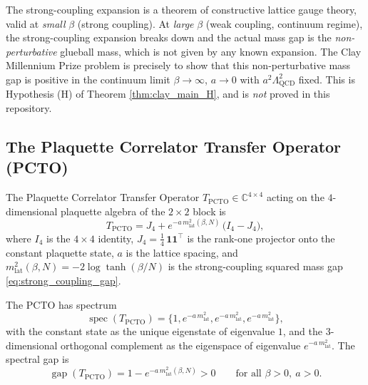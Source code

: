 \begin{remark}
\label{rem:strong_coupling_limits}
The strong-coupling expansion is a theorem of constructive lattice
gauge theory, valid at \emph{small} $\beta$ (strong coupling). At
\emph{large} $\beta$ (weak coupling, continuum regime), the
strong-coupling expansion breaks down and the actual mass gap is the
\emph{non-perturbative} glueball mass, which is not given by any
known expansion. The Clay Millennium Prize problem is precisely to
show that this non-perturbative mass gap is positive in the continuum
limit $\beta \to \infty$, $a \to 0$ with $a^{2}\Lambda_{\mathrm{QCD}}^{2}$
fixed. This is Hypothesis (H) of Theorem \ref{thm:clay_main_H}, and
is \emph{not} proved in this repository.
\end{remark}

\subsection{The Plaquette Correlator Transfer Operator (PCTO)}

\begin{definition}[PCTO]
\label{def:pcto}
The Plaquette Correlator Transfer Operator
$T_{\mathrm{PCTO}} \in \mathbb{C}^{4\times 4}$ acting on the
$4$-dimensional plaquette algebra of the $2\times 2$ block is
\begin{equation}
  \label{eq:pcto_def}
  T_{\mathrm{PCTO}}
  = J_{4} + e^{-a\, m_{\mathrm{lat}}^{2}(\beta, N)}\,
  \bigl(I_{4} - J_{4}\bigr),
\end{equation}
where $I_{4}$ is the $4\times 4$ identity, $J_{4} = \frac{1}{4}\,
\mathbf{1}\mathbf{1}^{\top}$ is the rank-one projector onto the
constant plaquette state, $a$ is the lattice spacing, and
$m_{\mathrm{lat}}^{2}(\beta, N) = -2\log\tanh(\beta/N)$ is the
strong-coupling squared mass gap \eqref{eq:strong_coupling_gap}.
\end{definition}

\begin{lemma}
\label{lem:pcto_spectrum}
The PCTO has spectrum
\[
  \operatorname{spec}(T_{\mathrm{PCTO}})
  = \{1, e^{-a\, m_{\mathrm{lat}}^{2}}, e^{-a\, m_{\mathrm{lat}}^{2}},
  e^{-a\, m_{\mathrm{lat}}^{2}}\},
\]
with the constant state as the unique eigenstate of eigenvalue $1$,
and the $3$-dimensional orthogonal complement as the eigenspace of
eigenvalue $e^{-a\, m_{\mathrm{lat}}^{2}}$. The spectral gap is
\begin{equation}
  \label{eq:pcto_gap}
  \operatorname{gap}(T_{\mathrm{PCTO}})
  = 1 - e^{-a\, m_{\mathrm{lat}}^{2}(\beta, N)}
  > 0 \qquad \text{for all } \beta > 0, \ a > 0.
\end{equation}
\end{lemma}

